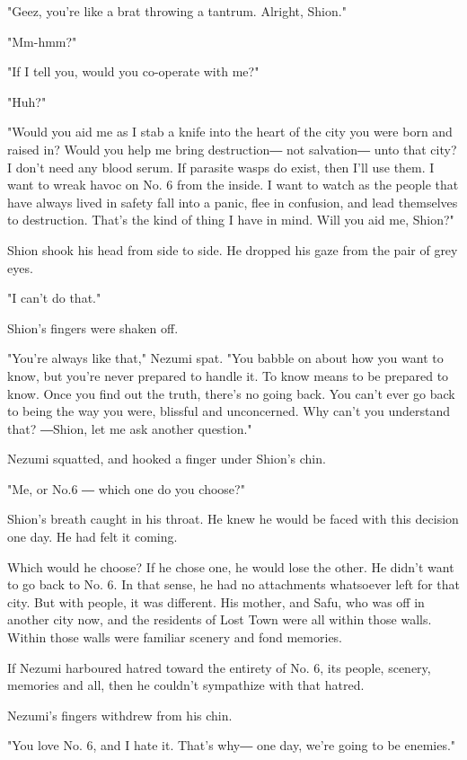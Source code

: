 "Geez, you're like a brat throwing a tantrum. Alright, Shion."

"Mm-hmm?"

"If I tell you, would you co-operate with me?"

"Huh?"

"Would you aid me as I stab a knife into the heart of the city you were
born and raised in? Would you help me bring destruction― not salvation―
unto that city? I don't need any blood serum. If parasite wasps do
exist, then I'll use them. I want to wreak havoc on No. 6 from the
inside. I want to watch as the people that have always lived in safety
fall into a panic, flee in confusion, and lead themselves to
destruction. That's the kind of thing I have in mind. Will you aid me,
Shion?"

Shion shook his head from side to side. He dropped his gaze from the
pair of grey eyes.

"I can't do that."

Shion's fingers were shaken off.

"You're always like that," Nezumi spat. "You babble on about how you
want to know, but you're never prepared to handle it. To know means to
be prepared to know. Once you find out the truth, there's no going back.
You can't ever go back to being the way you were, blissful and
unconcerned. Why can't you understand that? ―Shion, let me ask another
question."

Nezumi squatted, and hooked a finger under Shion's chin.

"Me, or No.6 ― which one do you choose?"

Shion's breath caught in his throat. He knew he would be faced with this
decision one day. He had felt it coming.

Which would he choose? If he chose one, he would lose the other. He
didn't want to go back to No. 6. In that sense, he had no attachments
whatsoever left for that city. But with people, it was different. His
mother, and Safu, who was off in another city now, and the residents of
Lost Town were all within those walls. Within those walls were familiar
scenery and fond memories.

If Nezumi harboured hatred toward the entirety of No. 6, its people,
scenery, memories and all, then he couldn't sympathize with that hatred.

Nezumi's fingers withdrew from his chin.

"You love No. 6, and I hate it. That's why― one day, we're going to be
enemies."

